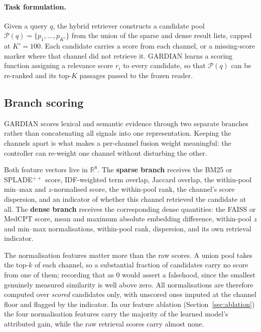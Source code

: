 \paragraph{Task formulation.}
Given a query $q$, the hybrid retriever constructs a candidate pool
$\mathcal{P}(q)=\{p_1,\ldots,p_{K'}\}$ from the union of the sparse and dense
result lists, capped at $K'\!=\!100$. Each candidate carries a score from each
channel, or a missing-score marker where that channel did not retrieve it.
GARDIAN learns a scoring function assigning a relevance score $r_i$ to every
candidate, so that $\mathcal{P}(q)$ can be re-ranked and its top-$K$ passages
passed to the frozen reader.

\subsection{Branch scoring}
\label{sec:features}

GARDIAN scores lexical and semantic evidence through two separate branches
rather than concatenating all signals into one representation. Keeping the
channels apart is what makes a per-channel fusion weight meaningful: the
controller can re-weight one channel without disturbing the other.

Both feature vectors live in $\mathbb{R}^{8}$. The \textbf{sparse branch}
receives the BM25 or SPLADE$^{++}$ score, IDF-weighted term overlap, Jaccard
overlap, the within-pool min--max and $z$-normalised score, the within-pool
rank, the channel's score dispersion, and an indicator of whether this channel
retrieved the candidate at all. The \textbf{dense branch} receives the
corresponding dense quantities: the FAISS or MedCPT score, mean and maximum
absolute embedding difference, within-pool $z$ and min--max normalisations,
within-pool rank, dispersion, and its own retrieval indicator.

The normalisation features matter more than the raw scores. A union pool takes
the top-$k$ of each channel, so a substantial fraction of candidates carry no
score from one of them; recording that as $0$ would assert a falsehood, since
the smallest genuinely measured similarity is well above zero. All
normalisations are therefore computed over \emph{scored} candidates only, with
unscored ones imputed at the channel floor and flagged by the indicator. In
our feature ablation (Section~\ref{sec:ablation}) the four normalisation
features carry the majority of the learned model's attributed gain, while the
raw retrieval scores carry almost none.

